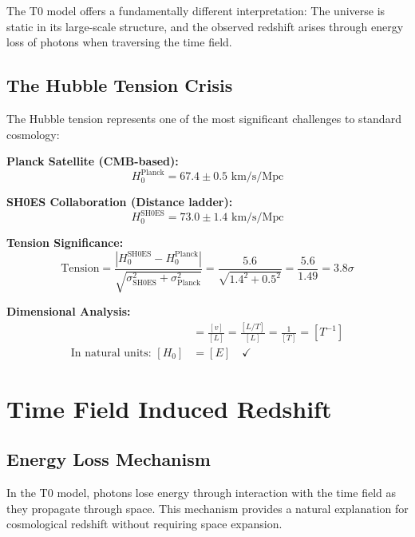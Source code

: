 \documentclass[12pt,a4paper]{report}
\begin{document}
	The T0 model offers a fundamentally different interpretation: The universe is static in its large-scale structure, and the observed redshift arises through energy loss of photons when traversing the time field.
	
	\subsection{The Hubble Tension Crisis}
	\label{subsec:hubble_tension_crisis}
	
	The Hubble tension represents one of the most significant challenges to standard cosmology:
	
	\textbf{Planck Satellite (CMB-based):}
	\begin{equation}
		H_0^{\text{Planck}} = 67.4 \pm 0.5 \text{ km/s/Mpc}
	\end{equation}
	
	\textbf{SH0ES Collaboration (Distance ladder):}
	\begin{equation}
		H_0^{\text{SH0ES}} = 73.0 \pm 1.4 \text{ km/s/Mpc}
	\end{equation}
	
	\textbf{Tension Significance:}
	\begin{equation}
		\text{Tension} = \frac{|H_0^{\text{SH0ES}} - H_0^{\text{Planck}}|}{\sqrt{\sigma_{\text{SH0ES}}^2 + \sigma_{\text{Planck}}^2}} = \frac{5.6}{\sqrt{1.4^2 + 0.5^2}} = \frac{5.6}{1.49} = 3.8\sigma
	\end{equation}
	
	\textbf{Dimensional Analysis:}
	\begin{align}
		[H_0] &= \frac{[v]}{[L]} = \frac{[L/T]}{[L]} = \frac{1}{[T]} = [T^{-1}] \\
		\text{In natural units: } [H_0] &= [E] \quad \checkmark
	\end{align}
	
	\section{Time Field Induced Redshift}
	\label{sec:timefield_redshift}
	
	\subsection{Energy Loss Mechanism}
	\label{subsec:energy_loss_mechanism}
	
	In the T0 model, photons lose energy through interaction with the time field as they propagate through space. This mechanism provides a natural explanation for cosmological redshift without requiring space expansion.
	
\end{document}
